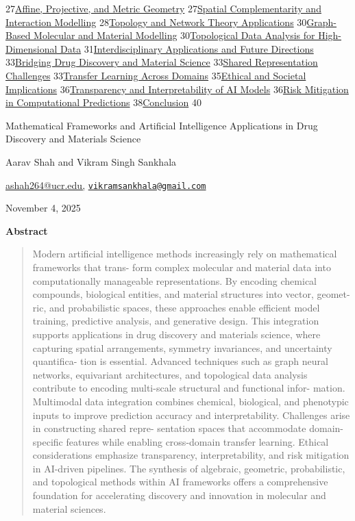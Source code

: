 \documentclass[
]{article}
\begin{document}
27\hyperref[affine-projective-and-metric-geometry]{Affine, Projective,
and Metric Geometry}
27\hyperref[spatial-complementarity-and-interaction-modelling]{Spatial
Complementarity and Interaction Modelling}
28\hyperref[topology-and-network-theory-applications]{Topology and
Network Theory Applications}
30\hyperref[graph-based-molecular-and-material-modelling]{Graph-Based
Molecular and Material Modelling}
30\hyperref[topological-data-analysis-for-high-dimensional-data]{Topological
Data Analysis for High-Dimensional Data}
31\hyperref[interdisciplinary-applications-and-future-directions]{Interdisciplinary
Applications and Future Directions}
33\hyperref[bridging-drug-discovery-and-material-science]{Bridging Drug
Discovery and Material Science}
33\hyperref[shared-representation-challenges]{Shared Representation
Challenges} 33\hyperref[transfer-learning-across-domains]{Transfer
Learning Across Domains}
35\hyperref[ethical-and-societal-implications]{Ethical and Societal
Implications}
36\hyperref[transparency-and-interpretability-of-ai-models]{Transparency
and Interpretability of AI Models}
36\hyperref[risk-mitigation-in-computational-predictions]{Risk
Mitigation in Computational Predictions}
38\hyperref[conclusion]{Conclusion} 40

Mathematical Frameworks and Artificial Intelligence Applications in Drug
Discovery and Materials Science

Aarav Shah and Vikram Singh Sankhala

\href{mailto:ashah264@ucr.edu}{ashah264@ucr.edu,}
\href{mailto:vikramsankhala@gmail.com}{\nolinkurl{vikramsankhala@gmail.com}}

November 4, 2025

\textbf{Abstract}

\begin{quote}
Modern artificial intelligence methods increasingly rely on mathematical
frameworks that trans- form complex molecular and material data into
computationally manageable representations. By encoding chemical
compounds, biological entities, and material structures into vector,
geomet- ric, and probabilistic spaces, these approaches enable efficient
model training, predictive analysis, and generative design. This
integration supports applications in drug discovery and materials
science, where capturing spatial arrangements, symmetry invariances, and
uncertainty quantifica- tion is essential. Advanced techniques such as
graph neural networks, equivariant architectures, and topological data
analysis contribute to encoding multi-scale structural and functional
infor- mation. Multimodal data integration combines chemical,
biological, and phenotypic inputs to improve prediction accuracy and
interpretability. Challenges arise in constructing shared repre-
sentation spaces that accommodate domain-specific features while
enabling cross-domain transfer learning. Ethical considerations
emphasize transparency, interpretability, and risk mitigation in
AI-driven pipelines. The synthesis of algebraic, geometric,
probabilistic, and topological methods within AI frameworks offers a
comprehensive foundation for accelerating discovery and innovation in
molecular and material sciences.
\end{quote}
\end{document}
